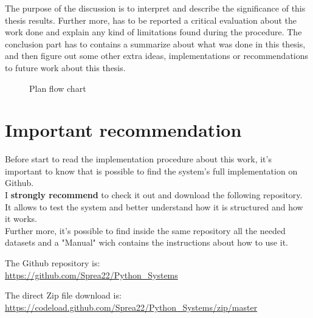 The purpose of the discussion is to interpret and describe the significance of this thesis results. Further more, has to be reported a critical evaluation about the work done and explain any kind of limitations found during the procedure.
The conclusion part has to contains a summarize about what was done in this thesis, and then figure out some other extra ideas, implementations or recommendations to future work about this thesis.\\
\begin{figure}[h]
    \caption[Plan flow chart]{Plan flow chart}
    \label{fig: Development_Flow}
\end{figure}


\section{Important recommendation}
Before start to read the implementation procedure about this work, it's important to know that is possible to find the system's full implementation on Github.\\
I \textbf{strongly recommend} to check it out and download the following repository. It allows to test the system and better understand how it is structured and how it works.\\
Further more, it's possible to find inside the same repository all the needed datasets and a "Manual" wich contains the instructions about how to use it.

The Github repository is:\\
\url{https://github.com/Sprea22/Python_Systems}

The direct Zip file download is:\\
\url{https://codeload.github.com/Sprea22/Python_Systems/zip/master}

